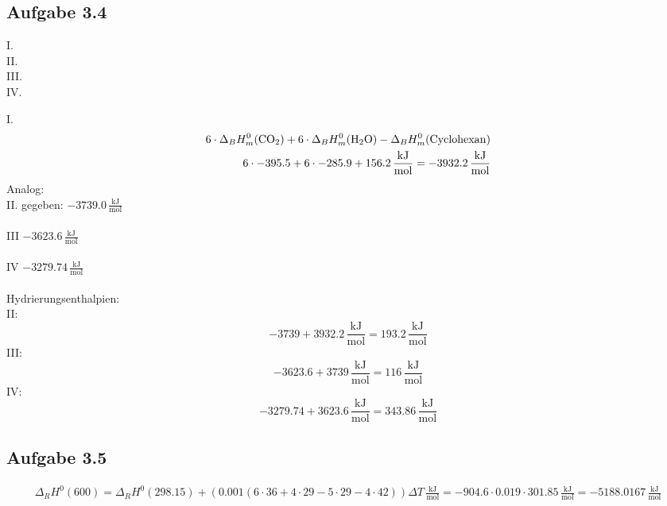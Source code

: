 \documentclass{article}
\begin{document}
\subsection*{Aufgabe 3.4}
\begin{center}
    I. \\
    II. \\
    III. \\
    IV. 
\end{center}
I.
\begin{eqnarray*}
    6\cdot\Delta_BH^0_m(\ce{CO2})+6\cdot\Delta_BH^0_m(\ce{H2O})-\Delta_BH^0_m(\mathrm{Cyclohexan})\\
    6\cdot -395.5 + 6 \cdot -285.9 + 156.2\,\mathrm{\frac{kJ}{mol}} = -3932.2\,\mathrm{\frac{kJ}{mol}}\\
\end{eqnarray*}
Analog:\\
II. gegeben: $-3739.0\,\mathrm{\frac{kJ}{mol}}$\\\\
III $-3623.6\,\mathrm{\frac{kJ}{mol}}$\\\\
IV $-3279.74\,\mathrm{\frac{kJ}{mol}}$\\\\
Hydrierungsenthalpien:\\
II:
\begin{equation*}
    -3739 + 3932.2 \,\mathrm{\frac{kJ}{mol}}= 193.2\,\mathrm{\frac{kJ}{mol}}
\end{equation*}
III:
\begin{equation*}
    -3623.6 + 3739 \,\mathrm{\frac{kJ}{mol}}= 116\,\mathrm{\frac{kJ}{mol}}
\end{equation*}
IV:
\begin{equation*}
    -3279.74 + 3623.6 \,\mathrm{\frac{kJ}{mol}}= 343.86\,\mathrm{\frac{kJ}{mol}}
\end{equation*}
\subsection*{Aufgabe 3.5}
\begin{eqnarray*}
    \Delta_RH^0(600)=\Delta_RH^0(298.15)+(0.001(6\cdot 36 + 4\cdot 29 - 5 \cdot 29 - 4\cdot 42))\Delta T \,\mathrm{\frac{kJ}{mol}}= -904.6 \cdot 0.019 \cdot 301.85 \,\mathrm{\frac{kJ}{mol}} = -5188.0167\,\mathrm{\frac{kJ}{mol}}
\end{eqnarray*}
\end{document}
